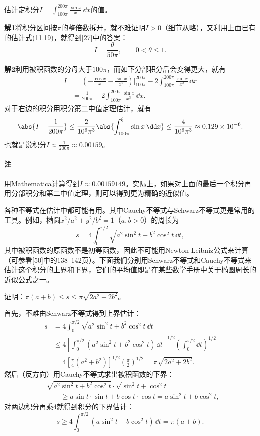 \begin{xexample}[11.3.2]
估计定积分$I=\int_{100\pi}^{200\pi}\frac{\sin x}{x}\,\dd x$的值。
\end{xexample}
\begin{xsolution}
\textbf{解1}\quad 将积分区间按$\pi$的整倍数拆开，就不难证明$I>0$（细节从略），又利用上面已有的估计式(11.19)，就得到[27]中的答案：
\[
  I=\frac{\theta}{50\pi},\qquad 0<\theta\le1.
\]

\textbf{解2}\quad 利用被积函数的分母大于$100\pi$，而如下分部积分后会变得更大，就有
\begin{align*}
I&=\left(-\frac{\cos x}{x}-\frac{\sin x}{x^2}\right)\Big|_{100\pi}^{200\pi}
 -2\int_{100\pi}^{200\pi}\frac{\sin x}{x^3}\,\dd x\\
&=\frac1{200\pi}-2\int_{100\pi}^{200\pi}\frac{\sin x}{x^3}\,\dd x.
\end{align*}
对于右边的积分用积分第二中值定理估计，就有
\[
  \abs{I-\frac1{200\pi}}
  \le\frac2{10^6\pi^3}\abs{\int_{100\pi}^{\xi}\sin x\,\dd x}
  \le\frac4{10^6\pi^3}\approx0.129\times10^{-6}.
\]
也就是说积分$I\approx\frac1{200\pi}\approx0.00159$。

\paragraph{注} 用Mathematica计算得到$I\approx0.00159149$。实际上，如果对上面的最后一个积分再用分部积分和第二中值定理，则可以得到更为精确的近似值。
\end{xsolution}

各种不等式在估计中都可能有用。其中Cauchy不等式与Schwarz不等式更是常用的工具。例如，椭圆$x^2/a^2+y^2/b^2=1$（$a,b>0$）的周长为
\[
  s=4\int_0^{\pi/2}\sqrt{a^2\sin^2t+b^2\cos^2t}\,\dd t,
\]
其中被积函数的原函数不是初等函数，因此不可能用Newton-Leibniz公式来计算（可参看[50]中的138--142页）。下面我们分别用Schwarz不等式和Cauchy不等式来估计这个积分的上界和下界，它们的平均值即是在某些数学手册中关于椭圆周长的近似公式之一。

\begin{xexample}[11.3.3]
证明：$\pi(a+b)\le s\le\pi\sqrt{2a^2+2b^2}$。
\end{xexample}
\begin{xproof}
首先，不难由Schwarz不等式得到上界估计：
\begin{align*}
s&=4\int_0^{\pi/2}\sqrt{a^2\sin^2t+b^2\cos^2t}\,\dd t\\
&\le4\left[\int_0^{\pi/2}(a^2\sin^2t+b^2\cos^2t)\,\dd t\right]^{1/2}
\left(\int_0^{\pi/2}\dd t\right)^{1/2}\\
&=4\left[\frac\pi4(a^2+b^2)\right]^{1/2}\left(\frac\pi2\right)^{1/2}
=\pi\sqrt{2a^2+2b^2}.
\end{align*}
然后（反方向）用Cauchy不等式求出被积函数的下界：
\begin{align*}
&\sqrt{a^2\sin^2t+b^2\cos^2t}\cdot\sqrt{\sin^2t+\cos^2t}\\
&\qquad\ge a\sin t\cdot\sin t+b\cos t\cdot\cos t
=a\sin^2t+b\cos^2t,
\end{align*}
对两边积分再乘4就得到积分的下界估计：
\[
  s\ge4\int_0^{\pi/2}(a\sin^2t+b\cos^2t)\,\dd t=\pi(a+b).
\]
\end{xproof}

